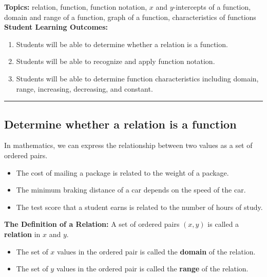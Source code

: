 

\noindent \textbf{Topics:}  relation, function, function notation, $x$ and $y$-intercepts of a function, domain and range of a function, graph of a function, characteristics of functions\\

\noindent \textbf{Student Learning Outcomes:}
\begin{enumerate}
\item Students will be able to determine whether a relation is a function.
\item Students will be able to recognize and apply function notation.
\item Students will be able to determine function characteristics including domain, range, increasing, decreasing, and constant.
\end{enumerate}

\hrule 

\bigskip

\subsection{Determine whether a relation is a function}
In mathematics, we can express the relationship between two values as a set of ordered pairs.
\begin{itemize}
\item The cost of mailing a package is related to the weight of a package.
\item The minimum braking distance of a car depends on the speed of the car.
\item The test score that a student earns is related to the number of hours of study.\\
\end{itemize}

\noindent \textbf{The Definition of a Relation:}  A set of ordered pairs $(x,y)$ is called a \textbf{relation} in $x$ and $y$.
\begin{itemize}
\item The set of $x$ values in the ordered pair is called the \textbf{domain} of the relation.
\item The set of $y$ values in the ordered pair is called the \textbf{range} of the relation.\\
\end{itemize}


